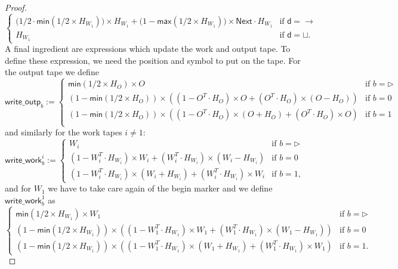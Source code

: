 \begin{proof}
$$\begin{cases}
            \bigl(1/2\cdot\mathsf{min}(1/2\times H_{W_1})\bigr)\times H_{W_1} + \bigl(1-\mathsf{max}(1/2\times H_{W_1})\bigr)\times \mathsf{Next}\cdot H_{W_1}  &\text{if $\mathsf{d}=\rightarrow$}\\
        H_{W_1} & \text{if $\mathsf{d}=\sqcup$}. 	
    \end{cases}
    $$
    A final ingredient are expressions which update the work and output tape.
    To define these expression, we need the position and symbol to put on the tape. For the output tape we define
    $$
    \mathsf{write\_outp}_b:=\begin{cases}
    \mathsf{min}(1/2\times H_O)\times O & \text{if $b=\rhd$}\\
    (1-\mathsf{min}(1/2\times H_O))\times\left((1-O^T\cdot H_O)\times O + (O^T\cdot H_O)\times (O-H_O)\right) &\text{if $b=0$}\\
    (1-\mathsf{min}(1/2\times H_O))\times\left((1-O^T\cdot H_O)\times (O+H_O) + (O^T\cdot H_O)\times O\right) &\text{if $b=1$}\\
    \end{cases}
    $$
    and similarly for the work tapes $i\neq 1$:
    $$
    \mathsf{write\_work}_b^i:=\begin{cases}
    W_i & \text{if $b=\rhd$}\\
    (1-W_i^T\cdot H_{W_i})\times W_i + (W_i^T\cdot H_{W_i})\times (W_i-H_{W_i}) &\text{if $b=0$}\\
    (1-W_i^T\cdot H_{W_i})\times (W_i+H_{W_i}) + (W_i^T\cdot H_{W_i})\times W_i &\text{if $b=1$},
    \end{cases}
    $$
    and for  $W_1$ we have to take care again of the begin marker and we define
	$    \mathsf{write\_work}_b^1
$ as
    $$
   \begin{cases} \mathsf{min}(1/2\times H_{W_1})\times W_1 & \text{if $b=\rhd$}\\
    (1-\mathsf{min}(1/2\times H_{W_1}))\times\left((1-W_1^T\cdot H_{W_1})\times W_1 + (W_1^T\cdot H_{W_1})\times (W_1-H_{W_1})\right) &\text{if $b=0$}\\
    (1-\mathsf{min}(1/2\times H_{W_1}))\times\left((1-W_1^T\cdot H_{W_1})\times (W_1+H_{W_1}) + (W_1^T\cdot H_{W_1})\times W_1\right) &\text{if $b=1$}.
    \end{cases}
    $$


\end{proof}
